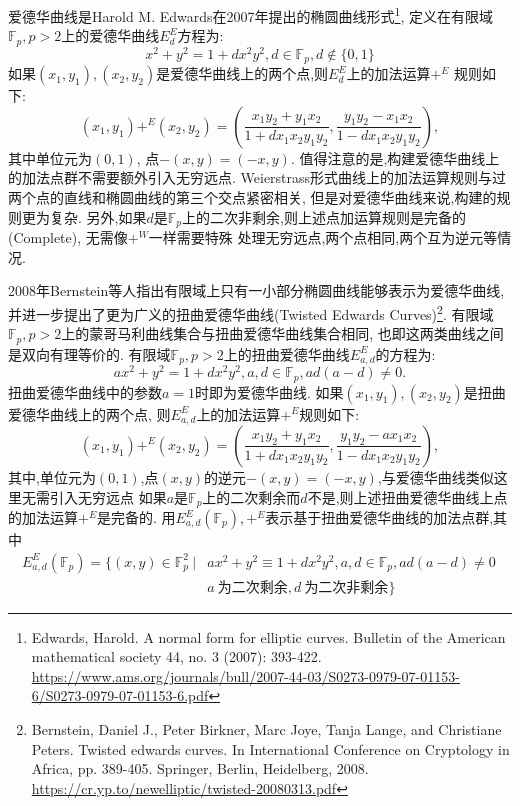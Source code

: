 \documentclass{article}
\newcommand{\F}{\mathbb{F}}
\begin{document}
爱德华曲线是Harold M. Edwards在2007年提出的椭圆曲线形式\footnote{
Edwards, Harold. 
A normal form for elliptic curves. 
Bulletin of the American mathematical society 44, no. 3 (2007): 393-422.
\url{https://www.ams.org/journals/bull/2007-44-03/S0273-0979-07-01153-6/S0273-0979-07-01153-6.pdf}},
定义在有限域$\F_p, p>2$上的爱德华曲线$E_{d}^E$方程为:
$$
x^2+y^2 = 1 + dx^2y^2, d \in \F_p, d \notin \{0,1\}
$$
如果$(x_1,y_1), (x_2, y_2)$是爱德华曲线上的两个点,则$E_{d}^E$上的加法运算$+^E$
规则如下:
$$
(x_1, y_1) +^E (x_2, y_2) = \left( \frac{x_1y_2 + y_1x_2}{1 + dx_1x_2y_1y_2}, \frac{y_1y_2 - x_1x_2}{1-dx_1x_2y_1y_2} \right),
$$
其中单位元为$(0,1)$, 点$-(x,y) = (-x,y)$.
值得注意的是,构建爱德华曲线上的加法点群不需要额外引入无穷远点.
Weierstrass形式曲线上的加法运算规则与过两个点的直线和椭圆曲线的第三个交点紧密相关,
但是对爱德华曲线来说,构建的规则更为复杂.
另外,如果$d$是$\F_p$上的二次非剩余,则上述点加运算规则是完备的(Complete), 无需像$+^W$一样需要特殊
处理无穷远点,两个点相同,两个互为逆元等情况.

2008年Bernstein等人指出有限域上只有一小部分椭圆曲线能够表示为爱德华曲线,
并进一步提出了更为广义的扭曲爱德华曲线(Twisted Edwards Curves)\footnote{
Bernstein, Daniel J., Peter Birkner, Marc Joye, Tanja Lange, and Christiane Peters. 
Twisted edwards curves. 
In International Conference on Cryptology in Africa, pp. 389-405. Springer, Berlin, Heidelberg, 2008.
\url{https://cr.yp.to/newelliptic/twisted-20080313.pdf}}.
有限域$\F_p,p>2$上的蒙哥马利曲线集合与扭曲爱德华曲线集合相同,
也即这两类曲线之间是双向有理等价的.
有限域$\F_p, p>2$上的扭曲爱德华曲线$E_{a,d}^E$的方程为:
$$
ax^2 + y^2 = 1 + dx^2y^2, a, d \in \F_p, ad(a-d)\neq 0.
$$
扭曲爱德华曲线中的参数$a=1$时即为爱德华曲线.
如果$(x_1,y_1), (x_2, y_2)$是扭曲爱德华曲线上的两个点,
则$E_{a,d}^E$上的加法运算$+^E$规则如下:
$$
(x_1, y_1) +^E (x_2, y_2) = \left( \frac{x_1y_2 + y_1x_2}{1 + dx_1x_2y_1y_2}, \frac{y_1y_2 - ax_1x_2}{1-dx_1x_2y_1y_2} \right),
$$
其中,单位元为$(0,1)$,点$(x,y)$的逆元$-(x,y) = (-x,y)$,与爱德华曲线类似这里无需引入无穷远点
如果$a$是$\F_p$上的二次剩余而$d$不是,则上述扭曲爱德华曲线上点的加法运算$+^E$是完备的.
用$E_{a,d}^E(\F_p), +^E$表示基于扭曲爱德华曲线的加法点群,其中
\begin{equation*}
\begin{array}{rl}
E_{a,d}^E(\F_p) = \{(x,y)\in\F_p^2 \ | & ax^2 + y^2 \equiv 1 + dx^2y^2, a, d \in \F_p, ad(a-d)\neq 0\, \\
& a\ \text{为二次剩余}, d\ \text{为二次非剩余} \}
\end{array}
\end{equation*}
\end{document}
